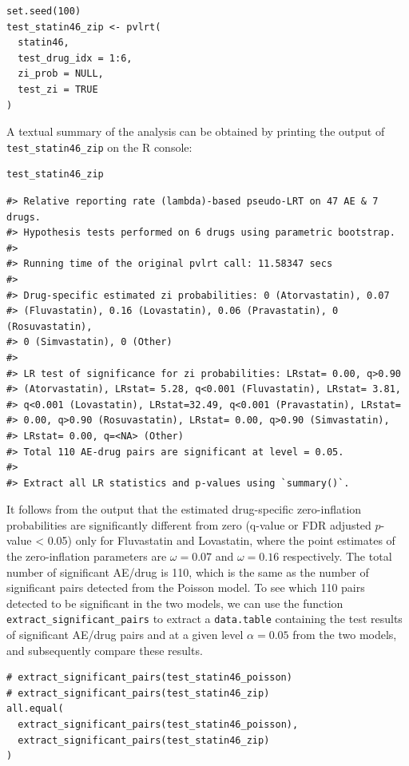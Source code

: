 \begin{verbatim}
set.seed(100) 
test_statin46_zip <- pvlrt(   
  statin46,   
  test_drug_idx = 1:6,   
  zi_prob = NULL,
  test_zi = TRUE
)
\end{verbatim}

\noindent A textual summary of the analysis can be obtained by printing the output of \texttt{test\_statin46\_zip} on the R console:

\begin{verbatim}
test_statin46_zip
\end{verbatim}

\begin{verbatim}
#> Relative reporting rate (lambda)-based pseudo-LRT on 47 AE & 7 drugs.
#> Hypothesis tests performed on 6 drugs using parametric bootstrap.
#> 
#> Running time of the original pvlrt call: 11.58347 secs
#> 
#> Drug-specific estimated zi probabilities: 0 (Atorvastatin), 0.07
#> (Fluvastatin), 0.16 (Lovastatin), 0.06 (Pravastatin), 0 (Rosuvastatin),
#> 0 (Simvastatin), 0 (Other)
#> 
#> LR test of significance for zi probabilities: LRstat= 0.00, q>0.90
#> (Atorvastatin), LRstat= 5.28, q<0.001 (Fluvastatin), LRstat= 3.81,
#> q<0.001 (Lovastatin), LRstat=32.49, q<0.001 (Pravastatin), LRstat=
#> 0.00, q>0.90 (Rosuvastatin), LRstat= 0.00, q>0.90 (Simvastatin),
#> LRstat= 0.00, q=<NA> (Other)
#> Total 110 AE-drug pairs are significant at level = 0.05.
#> 
#> Extract all LR statistics and p-values using `summary()`.
\end{verbatim}

It follows from the output that the estimated drug-specific zero-inflation probabilities are significantly different from zero (q-value or FDR adjusted \(p\)-value \textless{} 0.05) only for Fluvastatin and Lovastatin, where the point estimates of the zero-inflation parameters are \(\omega = 0.07\) and \(\omega = 0.16\) respectively. The total number of significant AE/drug is 110, which is the same as the number of significant pairs detected from the Poisson model. To see which 110 pairs detected to be significant in the two models, we can use the function \texttt{extract\_significant\_pairs} to extract a \texttt{data.table} containing the test results of significant AE/drug pairs and at a given level \(\alpha = 0.05\) from the two models, and subsequently compare these results.

\begin{verbatim}
# extract_significant_pairs(test_statin46_poisson)
# extract_significant_pairs(test_statin46_zip)
all.equal(
  extract_significant_pairs(test_statin46_poisson),
  extract_significant_pairs(test_statin46_zip)
)
\end{verbatim}

